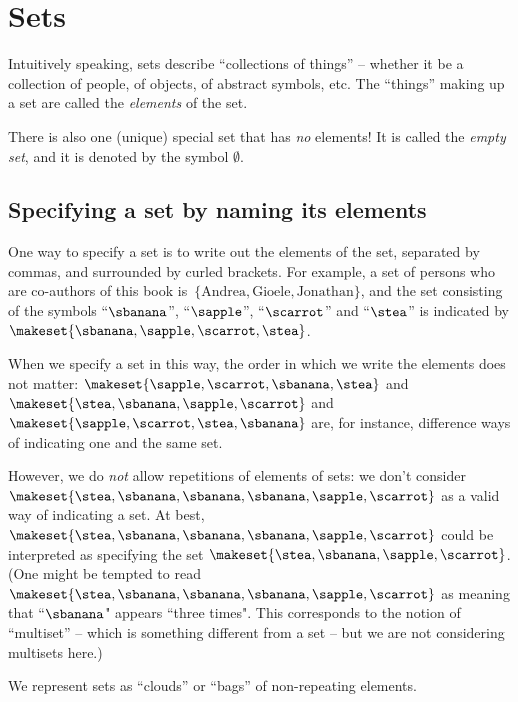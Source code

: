 
\section{Sets}

Intuitively speaking, sets describe ``collections of things'' -- whether it be a collection of people, of objects, of abstract symbols, etc.
The ``things'' making up a set are called the \emph{elements} of the set.

There is also one (unique) special set that has \emph{no} elements!
It is called the \emph{empty set}, and it is denoted by the symbol $\emptyset$.

\subsection{Specifying a set by naming its elements}

One way to specify a set is to write out the elements of the set, separated by commas, and surrounded by curled brackets.
For example, a set of persons who are co-authors of this book is~$\{ \text{Andrea}, \text{Gioele}, \text{Jonathan} \}$, and the set consisting of the symbols ``$\sbanana$'', ``$\sapple$'', ``$\scarrot$'' and ``$\stea$'' is indicated by $\makeset{ \sbanana, \sapple, \scarrot, \stea}$.

When we specify a set in this way, the order in which we write the elements does not matter:
$\makeset{ \sapple, \scarrot, \sbanana, \stea}$ and~$\makeset{ \stea, \sbanana, \sapple, \scarrot}$ and~$\makeset{ \sapple, \scarrot, \stea, \sbanana}$ are, for instance, difference ways of indicating one and the same set.

However, we do \emph{not} allow repetitions of elements of sets: we don't consider
$\makeset{ \stea, \sbanana, \sbanana, \sbanana, \sapple, \scarrot }$ as a valid way of indicating a set.
At best, $\makeset{ \stea, \sbanana, \sbanana, \sbanana, \sapple, \scarrot }$ could be interpreted as specifying the set $\makeset{ \stea, \sbanana, \sapple, \scarrot }$.
(One might be tempted to read $\makeset{ \stea, \sbanana, \sbanana, \sbanana, \sapple, \scarrot }$ as meaning that ``$\sbanana$" appears ``three times".
This corresponds to the notion of ``multiset'' -- which is something different from a set -- but we are not considering multisets here.)

\begin{marginfigure}
    \centering
    \caption{We represent sets as ``clouds'' or ``bags'' of non-repeating elements.}
    \label{fig:set_as_clouds}
\end{marginfigure}

